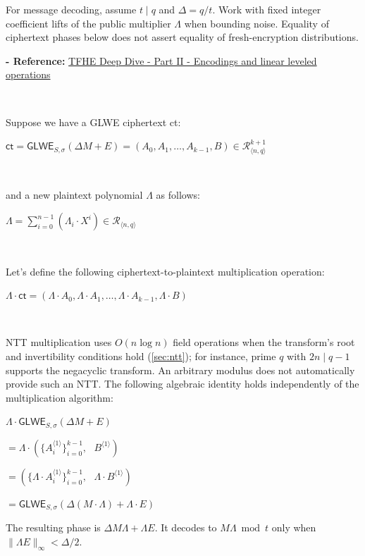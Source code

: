 For message decoding, assume $t\mid q$ and $\Delta=q/t$. Work with fixed integer coefficient lifts of the public multiplier $\Lambda$ when bounding noise. Equality of ciphertext phases below does not assert equality of fresh-encryption distributions.

\textbf{- Reference:} 
\href{https://www.zama.ai/post/tfhe-deep-dive-part-2}{TFHE Deep Dive - Part II - Encodings and linear leveled operations}~\cite{tfhe-2}

$ $

Suppose we have a GLWE ciphertext \textsf{ct}:

$\textsf{ct} = \textsf{GLWE}_{S, \sigma}(\Delta M + E) = ( A_0, A_1, \ldots, A_{k-1}, B) \in \mathcal{R}_{\langle n,q \rangle}^{k + 1}$

$ $

\noindent and a new plaintext polynomial $\Lambda$ as follows: 

$\Lambda = \sum\limits_{i=0}^{n-1}(\Lambda_i \cdot X^i) \in \mathcal{R}_{\langle n, q \rangle}$

$ $

\noindent Let's define the following ciphertext-to-plaintext multiplication operation:

$\Lambda \cdot \textsf{ct} = (\Lambda \cdot A_0, \Lambda \cdot A_1, \ldots, \Lambda \cdot A_{k-1}, \Lambda \cdot B)$

$ $

\noindent NTT multiplication uses $O(n\log n)$ field operations when the transform's root and invertibility conditions hold (\autoref{sec:ntt}); for instance, prime $q$ with $2n\mid q-1$ supports the negacyclic transform. An arbitrary modulus does not automatically provide such an NTT. The following algebraic identity holds independently of the multiplication algorithm:

\begin{tcolorbox}[title={\textbf{\tboxlabel{\ref*{sec:glwe-mult-plain}} GLWE Ciphertext-to-Plaintext Multiplication}}]
$\Lambda \cdot \textsf{GLWE}_{S, \sigma}(\Delta M + E)$

$= \Lambda \cdot (\{A_i^{\langle 1 \rangle}\}_{i=0}^{k-1}, \text{ } B^{\langle 1 \rangle})$

$= (\{\Lambda\cdot A_i^{\langle 1 \rangle}\}_{i=0}^{k-1}, \text{ } \Lambda \cdot B^{\langle 1 \rangle})$

$= \textsf{GLWE}_{S, \sigma}(\Delta (M \cdot \Lambda) + \Lambda\cdot E )$
\end{tcolorbox}

The resulting phase is $\Delta M\Lambda+\Lambda E$. It decodes to $M\Lambda\bmod t$ only when $\|\Lambda E\|_\infty<\Delta/2$.

